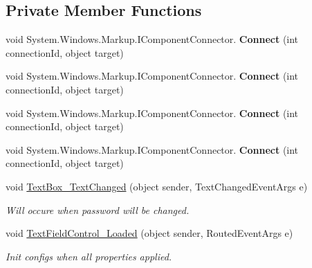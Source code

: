 \subsection*{Private Member Functions}
\begin{DoxyCompactItemize}
\item 
\mbox{\label{class_wpf_handler_1_1_u_i_1_1_controls_1_1_flat_text_box_a2caba72f3d815ce5a0db0589dfb78400}} 
void System.\+Windows.\+Markup.\+I\+Component\+Connector. {\bfseries Connect} (int connection\+Id, object target)
\item 
\mbox{\label{class_wpf_handler_1_1_u_i_1_1_controls_1_1_flat_text_box_a2caba72f3d815ce5a0db0589dfb78400}} 
void System.\+Windows.\+Markup.\+I\+Component\+Connector. {\bfseries Connect} (int connection\+Id, object target)
\item 
\mbox{\label{class_wpf_handler_1_1_u_i_1_1_controls_1_1_flat_text_box_a2caba72f3d815ce5a0db0589dfb78400}} 
void System.\+Windows.\+Markup.\+I\+Component\+Connector. {\bfseries Connect} (int connection\+Id, object target)
\item 
\mbox{\label{class_wpf_handler_1_1_u_i_1_1_controls_1_1_flat_text_box_a2caba72f3d815ce5a0db0589dfb78400}} 
void System.\+Windows.\+Markup.\+I\+Component\+Connector. {\bfseries Connect} (int connection\+Id, object target)
\item 
void \mbox{\hyperlink{class_wpf_handler_1_1_u_i_1_1_controls_1_1_flat_text_box_a4f374cedf385d1a3983e02f322a6f684}{Text\+Box\+\_\+\+Text\+Changed}} (object sender, Text\+Changed\+Event\+Args e)
\begin{DoxyCompactList}\small\item\em Will occure when password will be changed. \end{DoxyCompactList}\item 
void \mbox{\hyperlink{class_wpf_handler_1_1_u_i_1_1_controls_1_1_flat_text_box_a1d1990512144a1856294f2cef369d7b7}{Text\+Field\+Control\+\_\+\+Loaded}} (object sender, Routed\+Event\+Args e)
\begin{DoxyCompactList}\small\item\em Init configs when all properties applied. \end{DoxyCompactList}\end{DoxyCompactItemize}
